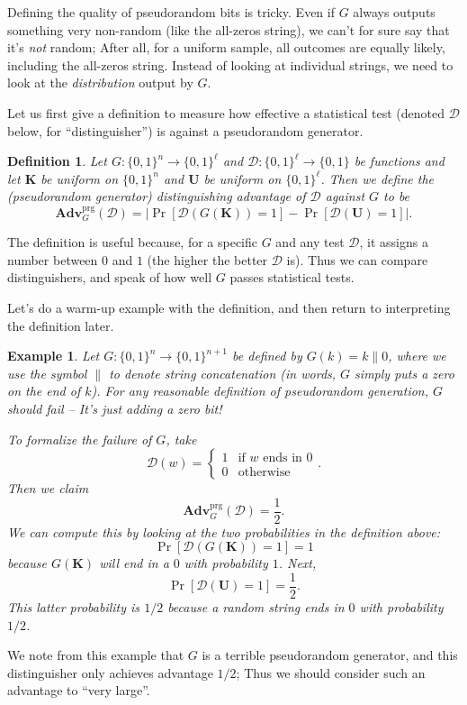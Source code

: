 \documentclass[11pt]{article}
\newtheorem{definition}{Definition}
\newtheorem{example}{Example}
\newcommand{\calD}{\mathcal{D}}
\newcommand{\Adv}{\mathbf{Adv}}
\newcommand{\AdvPRG}[2]{\Adv^{\mathrm{prg}}_{#1}({#2})}
\newcommand{\bits}{\{0,1\}}
\newcommand{\bK}{\mathbf{K}}
\newcommand{\bU}{\mathbf{U}}
\begin{document}
Defining the quality of pseudorandom bits is tricky. Even if $G$ always
outputs something very non-random (like the all-zeros string), we can't
for sure say that it's \emph{not} random; After all, for a uniform sample,
all outcomes are equally likely, including the all-zeros string.
Instead of looking at individual strings, we need to look at the
\emph{distribution} output by $G$.

Let us first give a definition to measure how effective a statistical test
(denoted $\calD$ below, for ``distinguisher'') is against a pseudorandom
generator.
\begin{definition}
    Let $G:\bits^n\to\bits^\ell$ and $\calD:\bits^\ell \to \bits$ be functions
    and let $\bK$ be uniform on $\bits^n$ and $\bU$ be uniform on $\bits^\ell$.
    Then we define the \emph{(pseudorandom generator) distinguishing advantage
    of $\calD$ against $G$} to be
    \[
        \AdvPRG{G}{\calD} =
        \left|\Pr[\calD(G(\bK))=1]-\Pr[\calD(\bU)=1]\right|.
    \]
\end{definition}
The definition is useful because, for a specific $G$ and any test $\calD$, it
assigns a number between $0$ and $1$ (the higher the better $\calD$ is).
Thus we can compare distinguishers, and speak of how well $G$ passes
statistical tests.

Let's do a warm-up example with the definition, and then return
to interpreting the definition later. 
\begin{example}
    Let $G:\bits^n\to\bits^{n+1}$ be defined by $G(k)=k\|0$, where we use
    the symbol $\|$ to denote string concatenation (in words, $G$ simply
    puts a zero on the end of $k$). For any reasonable definition of
    pseudorandom generation, $G$ should fail -- It's just adding a zero
    bit!

    To formalize the failure of $G$, take
    \[
        \calD(w) =
        \begin{cases}
            1 & \text{if $w$ ends in $0$}\\
            0 & \text{otherwise}
        \end{cases}.
    \]
    Then we claim
    \[
        \AdvPRG{G}{\calD} = \frac{1}{2}.
    \]
    We can compute this by looking at the two probabilities in the
    definition above:
    \[
        \Pr[\calD(G(\bK))=1] = 1
    \]
    because $G(\bK)$ will end in a $0$ with probability $1$.
    Next,
    \[
        \Pr[\calD(\bU)=1] = \frac{1}{2}.
    \]
    This latter probability is $1/2$ because a random string ends in
    $0$ with probability $1/2$.
\end{example}
We note from this example that $G$ is a terrible pseudorandom generator,
and this distinguisher only achieves advantage $1/2$; Thus we should
consider such an advantage to ``very large''.
\end{document}
